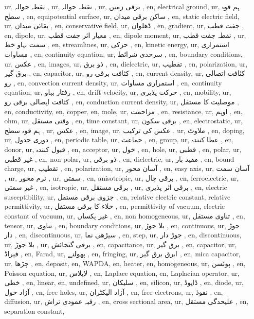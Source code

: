ur, نقطہ حوالہ ,
ur, نقطہ حوالہ ,
ur, برقی زمین ,
en, electrical ground,
ur, ہم قوہ سطح ,
en, equipotential surface,
ur, ساکن برقی میدان ,
en, static electric field,
ur, بقائی میدان ,
en, conservative field,
ur, ڈھلوان ,
en, gradient,
ur, جفت قطب ,
en, dipole,
ur, معیار اثر جفت قطب ,
en, dipole moment,
ur, نقطہ جفت قطب ,
ur, سمت بہاو خط ,
en, streamlines,
ur, حرکی ,
en, kinetic energy,
ur, استمراری مساوات ,
en, continuity equation,
ur, سرحدی شرائط ,
en, boundary conditions,
ur, عکس ,
en, images,
ur, ذو برق ,
en, dielectric,
ur, تقطیب ,
en, polarization,
ur, برق گیر ,
en, capacitor,
ur, کثافت برقی رو ,
en, current density,
ur, کثافت اتصالی رو ,
en, convection current density,
ur, استمراری مساوات ,
en, continuity equation,
ur, رفتار بہاو ,
en, drift velocity,
ur, حرکت پذیری ,
en, mobility,
ur, کثافت ایصالی برقی رو ,
en, conduction current density,
ur, موصلیت کا مستقل ,
en, conductivity,
en, copper,
en, mole,
ur, مزاحمت ,
en, resistance,
ur, اوہم ,
en, ohm,
ur, وقتی مستقل ,
en, time constant,
ur, برقی سکون ,
en, electrostatic,
ur, ہم قوہ سطح ,
ur, عکس ,
en, image,
ur, عکس کی ترکیب ,
ur, ملاوٹ ,
en, doping,
ur, دوری جدول ,
en, periodic table,
ur, جماعت ,
en, group,
ur, عطا کنندہ ,
en, donor,
ur, قبول کنندہ ,
en, acceptor,
ur, خول ,
en, hole,
ur, قطبی ,
en, polar,
ur, غیر قطبی ,
en, non polar,
ur, ذو برقی ,
en, dielectric,
ur, مقید بار ,
en, bound charge,
ur, تقطیب ,
en, polarization,
ur, آسان محور ,
en, easy axis,
ur, آسان سمت ,
ur, نرم محور ,
ur, سمتی ,
en, anisotropic,
ur, برقی چال ,
en, ferroelectric,
ur, غیر سمتی ,
en, isotropic,
ur, برقی مستقل ,
ur, برقی اثر پذیری ,
en, electric susceptibility,
ur, جزوی برقی مستقل ,
en, relative electric constant, relative permittivity,
ur, خلاء کا برقی مستقل ,
en, permittivity of vacuum, electric constant of vacuum,
ur, غیر یکساں ,
en, non homogeneous,
ur, تناوی مستقل ,
en, tensor,
ur, تناوی ,
en, boundary conditions,
ur, بلا جوڑ ,
en, continuous,
ur, جوڑ دار ,
en, discontinuous,
ur, سیڑھی نما ,
en, step,
ur, جوڑ دار ,
en, discontinuous,
ur, بلا جوڑ ,
ur, برقی گنجائش ,
en, capacitance,
ur, برق گیر ,
en, capacitor,
ur, فیراڈ ,
en, Farad,
ur, پھولنے ,
en, fringing,
ur, ابرق برق گیر ,
en, mica capacitor,
ur, چڑھا ,
en, deposit,
en, WAPDA,
en, heater,
en, homogeneous,
ur, پوئسن ,
en, Poisson equation,
ur, لاپلاس ,
en, Laplace equation,
en, Laplacian operator,
ur, خطی ,
en, linear,
en, undefined,
ur, سلیکان ,
en, silicon,
ur, ڈایوڈ ,
en, diode,
ur, آزاد خول ,
en, free holes,
ur, آزاد الیکٹران ,
en, free electrons,
ur, نفوذ ,
en, diffusion,
ur, رقبہ عمودی تراش ,
en, cross sectional area,
ur, علیحدگی مستقل ,
en, separation constant,
